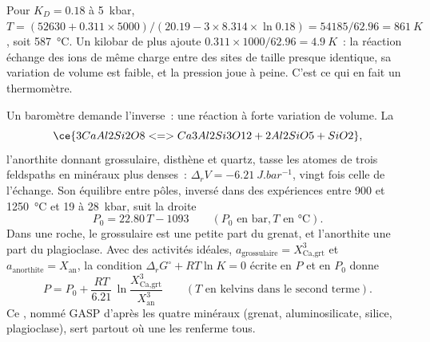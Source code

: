 \begin{omfigure}
\centering
{}
\par{}
\end{omfigure}

Pour $K_D = 0.18$ à \qty{5}{kbar}, $T = (52630 + 0.311\times5000)/(20.19 - 3\times8.314
\times\ln 0.18) = 54185/62.96 = \qty{861}{K}$, soit \qty{587}{\celsius}. Un kilobar de plus
ajoute $0.311\times1000/62.96 = \qty{4.9}{K}$~: la réaction échange des ions de même charge
entre des sites de taille presque identique, sa variation de volume est faible, et la pression
joue à peine. C'est ce qui en fait un thermomètre.

Un baromètre demande l'inverse~: une réaction à forte variation de volume. La
\[
\ce{3 CaAl2Si2O8 <=> Ca3Al2Si3O12 + 2 Al2SiO5 + SiO2},
\]
l'anorthite donnant grossulaire, disthène et quartz, tasse les atomes de trois feldspaths en
minéraux plus denses~: $\Delta_r V = \qty{-6.21}{J.bar^{-1}}$, vingt fois celle de l'échange.
Son équilibre entre pôles, inversé dans des expériences entre 900 et \qty{1250}{\celsius} et 19
à \qty{28}{kbar}, suit la droite
\[
P_0 = 22.80\,T - 1093 \qquad (P_0 \text{ en bar}, T \text{ en } \unit{\celsius}).
\]
Dans une roche, le grossulaire est une petite part du grenat, et l'anorthite une part du
plagioclase. Avec des activités idéales, $a_{\text{grossulaire}} = X_{\text{Ca,grt}}^3$ et
$a_{\text{anorthite}} = X_{\text{an}}$, la condition $\Delta_r G^\circ + RT\ln K = 0$
écrite en $P$ et en $P_0$ donne
\[
P = P_0 + \frac{RT}{6.21}\,\ln\frac{X_{\text{Ca,grt}}^3}{X_{\text{an}}^3}
\qquad (T \text{ en kelvins dans le second terme}).
\]
Ce , nommé GASP d'après les quatre minéraux (grenat, aluminosilicate, silice,
plagioclase), sert partout où une  les renferme tous.

